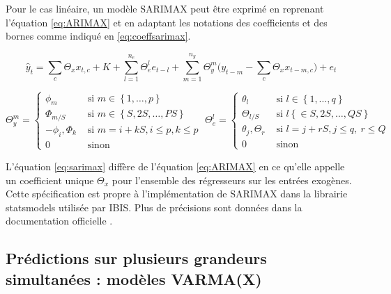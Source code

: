         Pour le cas linéaire, un modèle SARIMAX peut être exprimé en reprenant l'équation \ref{eq:ARIMAX} et en adaptant les notations des coefficients et des bornes comme indiqué en \ref{eq:coeffsarimax}.

        \begin{equation}
            \hat y_t = \sum_c \Theta_x x_{t,c} + K + \sum_{l=1}^{n_e}\Theta_e^{l}e_{t-l} + \sum_{m=1}^{n_y}\Theta_y^{m}\bigl(y_{t-m} - \sum_c \Theta_x x_{t-m,c}\bigr) + e_t\label{eq:sarimax}
        \end{equation}

        \begin{equation}
            \Theta_y^{m} = \left\{\begin{split}
                   \phi_m & \text{ si } m \in\left\{ {1,\ldots,p} \right\}\\
                   \Phi_{m/S} & \text{ si } m \in \left\{S, 2S, \ldots, PS\right\} \\
                   -\phi_i,\Phi_k & \text{ si } m = i + kS, i \leq p, k\leq p \\
                   0 & \text{ sinon}
            \end{split}\right. \;
            \Theta_e^{l} = \left\{\begin{split}
                  \theta_l & \text{ si } l \in \left\{1,\ldots,q\right\} \\
                  \Theta_{l/S} & \text{ si } l \left\{\in {S, 2S, \ldots, QS} \right\}\\
                  \theta_j,\Theta_r & \text{ si } l = j + rS, j\leq q,\ r\leq Q \\
                  0 & \text{ sinon}
                \end{split}\right.\label{eq:coeffsarimax}
        \end{equation}

        L'équation \ref{eq:sarimax} diffère de l'équation \ref{eq:ARIMAX} en ce qu'elle appelle un coefficient unique $\Theta_x$ pour l'ensemble des régresseurs sur les entrées exogènes.
        Cette spécification est propre à l'implémentation de SARIMAX dans la librairie statsmodels utilisée par IBIS. Plus de précisions sont données dans la documentation officielle \cite{statsmodels}.

    \subsection{Prédictions sur plusieurs grandeurs simultanées : modèles VARMA(X)}\label{subsec:predictions-sur-plusieurs-grandeurs-simultanees-:-modeles-varma(x)}